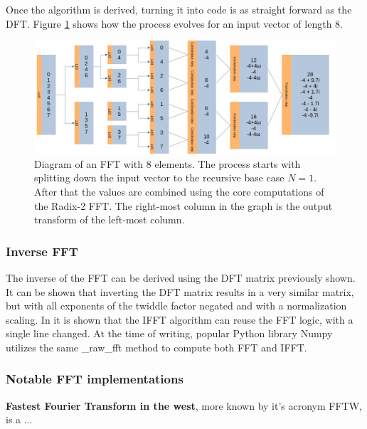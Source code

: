 Once the algorithm is derived, turning it into code is as straight forward as the DFT. Figure \ref{fig:FFT-Alg} shows how the process evolves for an input vector of length 8.

\begin{figure}[ht]
    \centering
    \includegraphics[width=\textwidth]{./images/fft.jpg}
    \caption{Diagram of an FFT with 8 elements. The process starts with splitting down the input vector to the recursive base case $N=1$. After that the values are combined using the core computations of the Radix-2 FFT. The right-most column in the graph is the output transform of the left-most column.\label{fig:FFT-Alg}}
\end{figure}

\subsubsection{Inverse FFT}
The inverse of the FFT can be derived using the DFT matrix previously shown. It can be shown that inverting the DFT matrix results in a very similar matrix, but with all exponents of the twiddle factor negated and with a normalization scaling. In \cite{Reducible2020} it is shown that the IFFT algorithm can reuse the FFT logic, with a single line changed. At the time of writing, popular Python library Numpy utilizes the same \_raw\_fft method to compute both FFT and IFFT.  

\subsubsection{Notable FFT implementations}
\textbf{Fastest Fourier Transform in the west}, more known by it's acronym FFTW, is a ...





